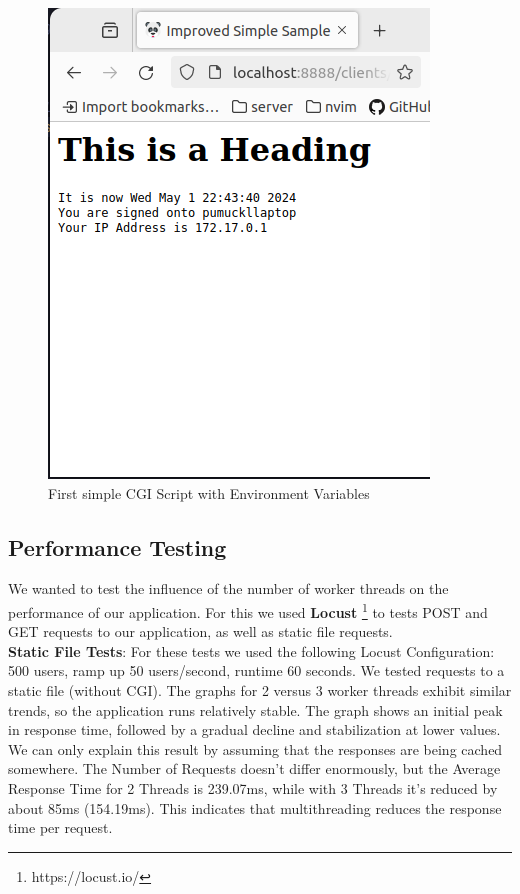 \begin{figure}[h]
\begin{minipage}{0.35\textwidth}
        \includegraphics[width=\textwidth]{figures/cgi.png}
        \caption{First simple CGI Script with Environment Variables}
    \end{minipage}
\end{figure}
\vspace{-15pt}
\subsection*{Performance Testing}
We wanted to test the influence of the number of worker threads on the performance of our application. For this we used \textbf{Locust} \footnote{https://locust.io/} to tests POST and GET requests to our application, as well as static file requests. \\

\textbf{Static File Tests}: 
For these tests we used the following Locust Configuration: 500 users, ramp up 50 users/second, runtime 60 seconds. We tested requests to a static file (without CGI). The graphs for 2 versus 3 worker threads exhibit similar trends, so the application runs relatively stable. 
The graph shows an initial peak in response time, followed by a gradual decline and stabilization at lower values. We can only explain this result by assuming that the responses are being cached somewhere.
The Number of Requests doesn't differ enormously, but the Average Response Time for 2 Threads is 239.07ms, while with 3 Threads it's reduced by about 85ms (154.19ms). This indicates that multithreading reduces the response time per request. 

